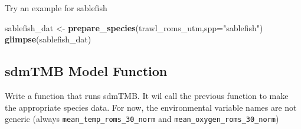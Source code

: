 \documentclass[
]{article}
\newenvironment{Shaded}{\begin{snugshade}}{\end{snugshade}}
\newcommand{\DataTypeTok}[1]{\textcolor[rgb]{0.13,0.29,0.53}{#1}}
\newcommand{\KeywordTok}[1]{\textcolor[rgb]{0.13,0.29,0.53}{\textbf{#1}}}
\newcommand{\NormalTok}[1]{#1}
\newcommand{\StringTok}[1]{\textcolor[rgb]{0.31,0.60,0.02}{#1}}
\begin{document}
Try an example for sablefish

\begin{Shaded}
\begin{Highlighting}[]
\NormalTok{sablefish_dat <-}\StringTok{ }\KeywordTok{prepare_species}\NormalTok{(trawl_roms_utm,}\DataTypeTok{spp=}\StringTok{"sablefish"}\NormalTok{)}
\KeywordTok{glimpse}\NormalTok{(sablefish_dat)}
\end{Highlighting}
\end{Shaded}

\hypertarget{sdmtmb-model-function}{%
\subsection{sdmTMB Model Function}\label{sdmtmb-model-function}}

Write a function that runs sdmTMB. It wil call the previous function to
make the appropriate species data. For now, the environmental variable
names are not generic (always \texttt{mean\_temp\_roms\_30\_norm} and
\texttt{mean\_oxygen\_roms\_30\_norm})
\end{document}
